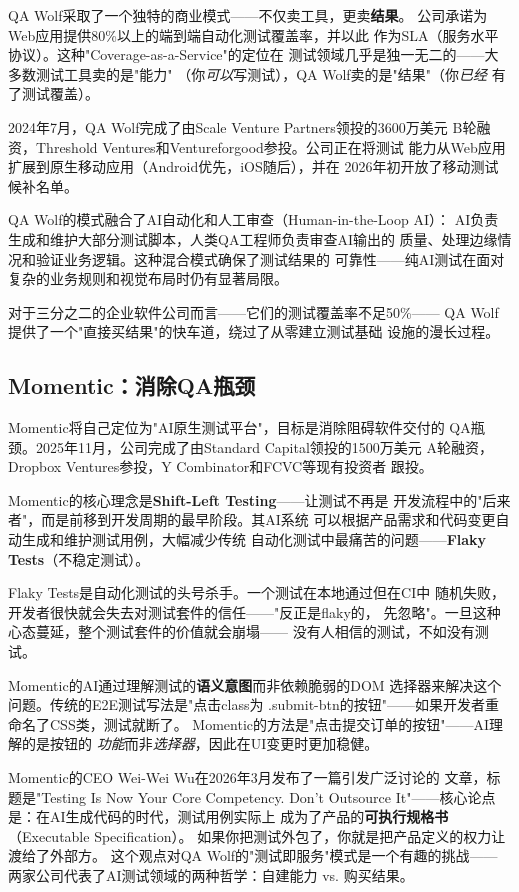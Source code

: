 QA Wolf采取了一个独特的商业模式——不仅卖工具，更卖\textbf{结果}。
公司承诺为Web应用提供80\%以上的端到端自动化测试覆盖率，并以此
作为SLA（服务水平协议）。这种"Coverage-as-a-Service"的定位在
测试领域几乎是独一无二的——大多数测试工具卖的是"能力"
（你\textit{可以}写测试），QA Wolf卖的是"结果"（你\textit{已经}
有了测试覆盖）。

2024年7月，QA Wolf完成了由Scale Venture Partners领投的3600万美元
B轮融资，Threshold Ventures和Ventureforgood参投。公司正在将测试
能力从Web应用扩展到原生移动应用（Android优先，iOS随后），并在
2026年初开放了移动测试候补名单。

QA Wolf的模式融合了AI自动化和人工审查（Human-in-the-Loop AI）：
AI负责生成和维护大部分测试脚本，人类QA工程师负责审查AI输出的
质量、处理边缘情况和验证业务逻辑。这种混合模式确保了测试结果的
可靠性——纯AI测试在面对复杂的业务规则和视觉布局时仍有显著局限。

对于三分之二的企业软件公司而言——它们的测试覆盖率不足50\%——
QA Wolf提供了一个"直接买结果"的快车道，绕过了从零建立测试基础
设施的漫长过程。

\subsection{Momentic：消除QA瓶颈}
\label{subsec:momentic}

Momentic将自己定位为"AI原生测试平台"，目标是消除阻碍软件交付的
QA瓶颈。2025年11月，公司完成了由Standard Capital领投的1500万美元
A轮融资，Dropbox Ventures参投，Y Combinator和FCVC等现有投资者
跟投。

Momentic的核心理念是\textbf{Shift-Left Testing}——让测试不再是
开发流程中的"后来者"，而是前移到开发周期的最早阶段。其AI系统
可以根据产品需求和代码变更自动生成和维护测试用例，大幅减少传统
自动化测试中最痛苦的问题——\textbf{Flaky Tests}（不稳定测试）。

Flaky Tests是自动化测试的头号杀手。一个测试在本地通过但在CI中
随机失败，开发者很快就会失去对测试套件的信任——"反正是flaky的，
先忽略"。一旦这种心态蔓延，整个测试套件的价值就会崩塌——
没有人相信的测试，不如没有测试。

Momentic的AI通过理解测试的\textbf{语义意图}而非依赖脆弱的DOM
选择器来解决这个问题。传统的E2E测试写法是"点击class为
.submit-btn的按钮"——如果开发者重命名了CSS类，测试就断了。
Momentic的方法是"点击提交订单的按钮"——AI理解的是按钮的
\textit{功能}而非\textit{选择器}，因此在UI变更时更加稳健。

Momentic的CEO Wei-Wei Wu在2026年3月发布了一篇引发广泛讨论的
文章，标题是"Testing Is Now Your Core Competency. Don't
Outsource It"——核心论点是：在AI生成代码的时代，测试用例实际上
成为了产品的\textbf{可执行规格书}（Executable Specification）。
如果你把测试外包了，你就是把产品定义的权力让渡给了外部方。
这个观点对QA Wolf的"测试即服务"模式是一个有趣的挑战——
两家公司代表了AI测试领域的两种哲学：自建能力 vs. 购买结果。

